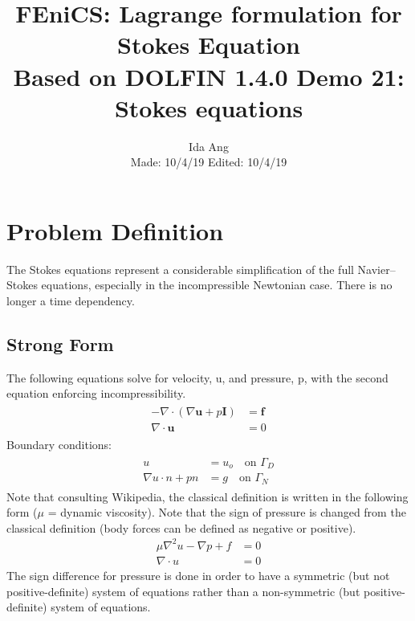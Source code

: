 \documentclass[12pt,3p]{article}
\begin{document}
\title{FEniCS: Lagrange formulation for Stokes Equation \\
	\large{Based on DOLFIN 1.4.0 Demo 21: Stokes equations}}
	\vspace{-5ex}
\author{Ida Ang \\
	\small{Made: 10/4/19} \quad \small{Edited: 10/4/19}}
\date{\vspace{-5ex}}
\maketitle

\section{Problem Definition}
The Stokes equations represent a considerable simplification of the full Navier–Stokes equations, especially in the incompressible Newtonian case. There is no longer a time dependency. 

\subsection{Strong Form}
 The following equations solve for velocity, u, and pressure, p, with the second equation enforcing incompressibility. 
\begin{align}\label{ProbDef}
\begin{split}
- \nabla \cdot (\nabla \mathbf{u} + p \mathbf{I}) &= \mathbf{f} \\
\nabla \cdot \mathbf{u} &= 0 
\end{split}
\end{align}
Boundary conditions:
\begin{align}
\begin{split}
u &= u_o \quad \text{on } \Gamma_D \\
\nabla u \cdot n + p n &= g \quad \text{on } \Gamma_N
\end{split}
\end{align}
Note that consulting Wikipedia, the classical definition is written in the following form ($\mu$ = dynamic viscosity). Note that the sign of pressure is changed from the classical definition (body forces can be defined as negative or positive).
\begin{align*}
\mu \nabla^2 u -\nabla p + f &= 0 \\
\nabla \cdot u &= 0 
\end{align*}
The sign difference for pressure is done in order to have a symmetric (but not positive-definite) system of equations rather than a non-symmetric (but positive-definite) system of equations.
\end{document}
